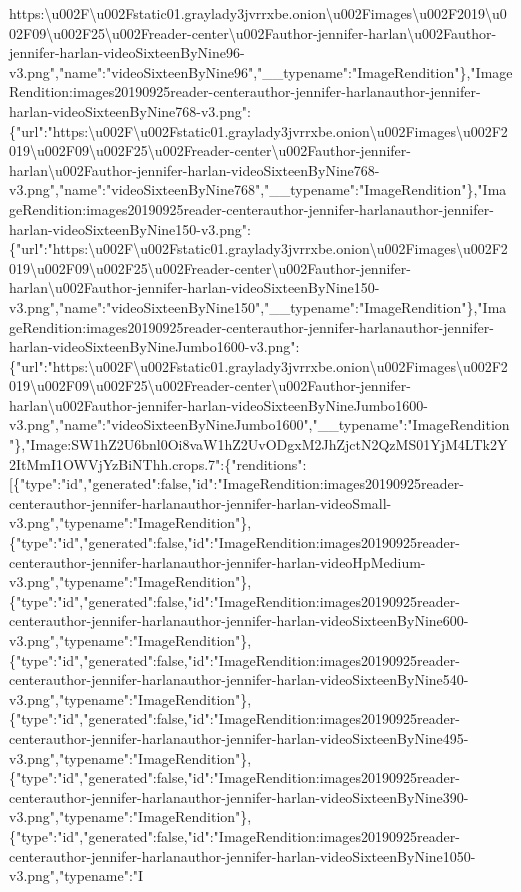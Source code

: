 https:\textbackslash{}u002F\textbackslash{}u002Fstatic01.graylady3jvrrxbe.onion\textbackslash{}u002Fimages\textbackslash{}u002F2019\textbackslash{}u002F09\textbackslash{}u002F25\textbackslash{}u002Freader-center\textbackslash{}u002Fauthor-jennifer-harlan\textbackslash{}u002Fauthor-jennifer-harlan-videoSixteenByNine96-v3.png","name":"videoSixteenByNine96","\_\_typename":"ImageRendition"\},"ImageRendition:images20190925reader-centerauthor-jennifer-harlanauthor-jennifer-harlan-videoSixteenByNine768-v3.png":\{"url":"https:\textbackslash{}u002F\textbackslash{}u002Fstatic01.graylady3jvrrxbe.onion\textbackslash{}u002Fimages\textbackslash{}u002F2019\textbackslash{}u002F09\textbackslash{}u002F25\textbackslash{}u002Freader-center\textbackslash{}u002Fauthor-jennifer-harlan\textbackslash{}u002Fauthor-jennifer-harlan-videoSixteenByNine768-v3.png","name":"videoSixteenByNine768","\_\_typename":"ImageRendition"\},"ImageRendition:images20190925reader-centerauthor-jennifer-harlanauthor-jennifer-harlan-videoSixteenByNine150-v3.png":\{"url":"https:\textbackslash{}u002F\textbackslash{}u002Fstatic01.graylady3jvrrxbe.onion\textbackslash{}u002Fimages\textbackslash{}u002F2019\textbackslash{}u002F09\textbackslash{}u002F25\textbackslash{}u002Freader-center\textbackslash{}u002Fauthor-jennifer-harlan\textbackslash{}u002Fauthor-jennifer-harlan-videoSixteenByNine150-v3.png","name":"videoSixteenByNine150","\_\_typename":"ImageRendition"\},"ImageRendition:images20190925reader-centerauthor-jennifer-harlanauthor-jennifer-harlan-videoSixteenByNineJumbo1600-v3.png":\{"url":"https:\textbackslash{}u002F\textbackslash{}u002Fstatic01.graylady3jvrrxbe.onion\textbackslash{}u002Fimages\textbackslash{}u002F2019\textbackslash{}u002F09\textbackslash{}u002F25\textbackslash{}u002Freader-center\textbackslash{}u002Fauthor-jennifer-harlan\textbackslash{}u002Fauthor-jennifer-harlan-videoSixteenByNineJumbo1600-v3.png","name":"videoSixteenByNineJumbo1600","\_\_typename":"ImageRendition"\},"Image:SW1hZ2U6bnl0Oi8vaW1hZ2UvODgxM2JhZjctN2QzMS01YjM4LTk2Y2ItMmI1OWVjYzBiNThh.crops.7":\{"renditions":{[}\{"type":"id","generated":false,"id":"ImageRendition:images20190925reader-centerauthor-jennifer-harlanauthor-jennifer-harlan-videoSmall-v3.png","typename":"ImageRendition"\},\{"type":"id","generated":false,"id":"ImageRendition:images20190925reader-centerauthor-jennifer-harlanauthor-jennifer-harlan-videoHpMedium-v3.png","typename":"ImageRendition"\},\{"type":"id","generated":false,"id":"ImageRendition:images20190925reader-centerauthor-jennifer-harlanauthor-jennifer-harlan-videoSixteenByNine600-v3.png","typename":"ImageRendition"\},\{"type":"id","generated":false,"id":"ImageRendition:images20190925reader-centerauthor-jennifer-harlanauthor-jennifer-harlan-videoSixteenByNine540-v3.png","typename":"ImageRendition"\},\{"type":"id","generated":false,"id":"ImageRendition:images20190925reader-centerauthor-jennifer-harlanauthor-jennifer-harlan-videoSixteenByNine495-v3.png","typename":"ImageRendition"\},\{"type":"id","generated":false,"id":"ImageRendition:images20190925reader-centerauthor-jennifer-harlanauthor-jennifer-harlan-videoSixteenByNine390-v3.png","typename":"ImageRendition"\},\{"type":"id","generated":false,"id":"ImageRendition:images20190925reader-centerauthor-jennifer-harlanauthor-jennifer-harlan-videoSixteenByNine1050-v3.png","typename":"I